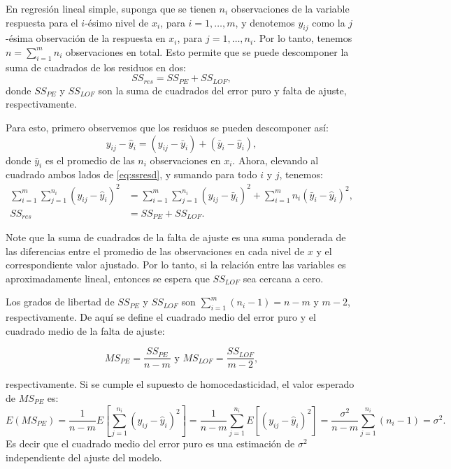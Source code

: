 \documentclass[
]{article}
\begin{document}
En regresión lineal simple, suponga que se tienen \(n_{i}\) observaciones de la variable respuesta para el \(i\)-ésimo nivel de \(x_{i}\), para \(i=1,\ldots,m\), y denotemos \(y_{ij}\) como la \(j\)-ésima observación de la respuesta en \(x_{i}\), para \(j=1,\ldots,n_{i}\). Por lo tanto, tenemos \(n=\sum_{i=1}^{m}n_{i}\) observaciones en total. Esto permite que se puede descomponer la suma de cuadrados de los residuos en dos:
\[
SS_{res} = SS_{PE} + SS_{LOF},
\]
donde \(SS_{PE}\) y \(SS_{LOF}\) son la suma de cuadrados del error puro y falta de ajuste, respectivamente.

Para esto, primero observemos que los residuos se pueden descomponer así:
\begin{equation}
y_{ij} - \widehat{y}_{i} = (y_{ij} - \bar{y}_{i}) + (\bar{y}_{i} - \widehat{y}_{i}),
\label{eq:ssresd}
\end{equation}
donde \(\bar{y}_{i}\) es el promedio de las \(n_{i}\) observaciones en \(x_{i}\). Ahora, elevando al cuadrado ambos lados de \eqref{eq:ssresd}, y sumando para todo \(i\) y \(j\), tenemos:
\begin{equation}
\begin{split}
\sum_{i=1}^{m} \sum_{j=1}^{n_{i}} (y_{ij} - \widehat{y}_{i})^{2} &= \sum_{i=1}^{m}\sum_{j=1}^{n_{i}}(y_{ij}-\bar{y}_{i})^{2} + \sum_{i=1}^{m}n_{i}(\bar{y}_{i}-\widehat{y}_{i})^{2}, \\
SS_{res} &= SS_{PE} + SS_{LOF}.
\end{split}
\nonumber
\end{equation}

Note que la suma de cuadrados de la falta de ajuste es una suma ponderada de las diferencias entre el promedio de las observaciones en cada nivel de \(x\) y el correspondiente valor ajustado. Por lo tanto, si la relación entre las variables es aproximadamente lineal, entonces se espera que \(SS_{LOF}\) sea cercana a cero.

Los grados de libertad de \(SS_{PE}\) y \(SS_{LOF}\) son \(\sum_{i=1}^{m}(n_{i}-1) = n-m\) y \(m-2\), respectivamente. De aquí se define el cuadrado medio del error puro y el cuadrado medio de la falta de ajuste:

\[
MS_{PE} = \frac{SS_{PE}}{n-m} \mbox{ y } MS_{LOF} = \frac{SS_{LOF}}{m-2},
\]

respectivamente. Si se cumple el supuesto de homocedasticidad, el valor esperado de \(MS_{PE}\) es:
\[
E(MS_{PE}) = \frac{1}{n-m}E\left[ \sum_{j=1}^{n_{i}}(y_{ij} - \widehat{y}_{i})^{2} \right] = \frac{1}{n-m}\sum_{j=1}^{n_{i}} E\left[ (y_{ij}-\widehat{y}_{i})^{2} \right] = \frac{\sigma^{2}}{n-m}\sum_{j=1}^{n_{i}}(n_{i}-1) = \sigma^{2}.
\]
Es decir que el cuadrado medio del error puro es una estimación de \(\sigma^{2}\) independiente del ajuste del modelo.
\end{document}
